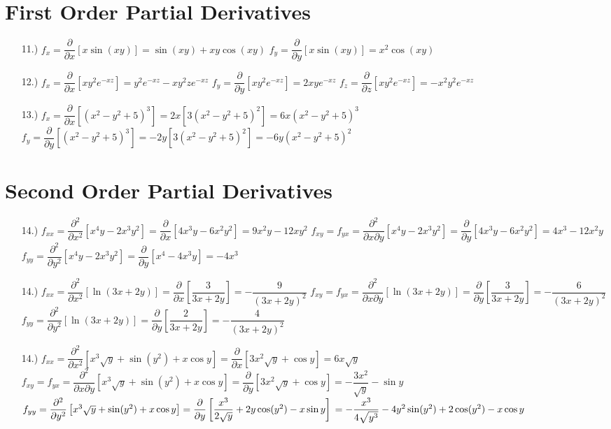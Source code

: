 \documentclass[12pt]{article}
\newcommand{\bracks}[1]{\left[#1\right]}
\newcommand{\pderv}[1]{\dfrac{\partial}{\partial#1}}
\newcommand{\p}{\partial}
\begin{document}
\section*{First Order Partial Derivatives}
\begin{itemize}
    \item [11.)] $f_x=\pderv{x}\bracks{x\sin(xy)}=\sin(xy)+xy\cos(xy)$\newline
    $f_y=\pderv{y}\bracks{x\sin(xy)}=x^2\cos(xy)$

    \item [12.)] $f_x=\pderv{x}\bracks{xy^2e^{-xz}}=y^2e^{-xz}-xy^2ze^{-xz}$\newline
    $f_y=\pderv{y}\bracks{xy^2e^{-xz}}=2xye^{-xz}$\newline
    $f_z=\pderv{z}\bracks{xy^2e^{-xz}}=-x^2y^2e^{-xz}$

    \item [13.)] $f_x=\pderv{x}\bracks{(x^2-y^2+5)^3}=2x[3(x^2-y^2+5)^2]=6x(x^2-y^2+5)^3$\newline
    $f_y=\pderv{y}\bracks{(x^2-y^2+5)^3}=-2y[3(x^2-y^2+5)^2]=-6y(x^2-y^2+5)^2$
\end{itemize}

\section*{Second Order Partial Derivatives}
\begin{itemize}
    \item [14.)] $f_{xx}=\dfrac{\p^2}{\p x^2}\bracks{x^4y-2x^3y^2}=\pderv{x}\bracks{4x^3y-6x^2y^2}=9x^2y-12xy^2$\newline
    $f_{xy}=f_{yx}=\dfrac{\p^2}{\p x\p y}\bracks{x^4y-2x^3y^2}=\pderv{y}\bracks{4x^3y-6x^2y^2}=4x^3-12x^2y$\newline
    $f_{yy}=\dfrac{\p^2}{\p y^2}\bracks{x^4y-2x^3y^2}=\pderv{y}\bracks{x^4-4x^3y}=-4x^3$

    \item [14.)] $f_{xx}=\dfrac{\p^2}{\p x^2}\bracks{\ln(3x+2y)}=\pderv{x}\bracks{\dfrac{3}{3x+2y}}=-\dfrac{9}{(3x+2y)^2}$\newline
    $f_{xy}=f_{yx}=\dfrac{\p^2}{\p x\p y}\bracks{\ln(3x+2y)}=\pderv{y}\bracks{\dfrac{3}{3x+2y}}=-\dfrac{6}{(3x+2y)^2}$\newline
    $f_{yy}=\dfrac{\p^2}{\p y^2}\bracks{\ln(3x+2y)}=\pderv{y}\bracks{\dfrac{2}{3x+2y}}=-\dfrac{4}{(3x+2y)^2}$

    \item [14.)] $f_{xx}=\dfrac{\p^2}{\p x^2}\bracks{x^3\sqrt{y}+\sin(y^2)+x\cos y}=\pderv{x}\bracks{3x^2\sqrt{y}+\cos{y}}=6x\sqrt{y}$\newline
    $f_{xy}=f_{yx}=\dfrac{\p^2}{\p x\p y}\bracks{x^3\sqrt{y}+\sin(y^2)+x\cos y}=\pderv{y}\bracks{3x^2\sqrt{y}+\cos y}=-\dfrac{3x^2}{\sqrt{y}}-\sin y$\newline
    $f_{yy}=\dfrac{\p^2}{\p y^2}\bracks{x^3\sqrt{y}+\sin(y^2)+x\cos y}=\pderv{y}\bracks{\dfrac{x^3}{2\sqrt{y}}+2y\cos(y^2)-x\sin y}\newline=-\dfrac{x^3}{4\sqrt{y^3}}-4y^2\sin(y^2)+2\cos(y^2)-x\cos y$
\end{itemize}
\end{document}
